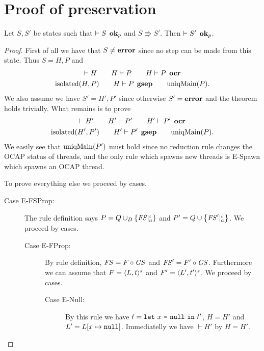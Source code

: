 \section{Proof of preservation}
\label{sec:proof_of_preservation}

\begin{theorem*}[Preservation]
  Let $S, S'$ be states such that $\vdash S \:\: \mbox{{\bf ok}$_p$}$ and $S \Rrightarrow
  S'$. Then $\vdash S' \:\: \mbox{{\bf ok}$_p$}$.
\end{theorem*}

\begin{proof} 
  First of all we have that $S \neq \mbox{{\bf error}}$ since no step can be made from this
  state. Thus $S = H, P$ and
  \begin{equation*}
    \begin{gathered}
      \vdash H \quad\quad H \vdash P \quad\quad H \vdash P \:\: \mbox{\bf ocr} \\
      \mbox{$\mathrm{isolated}$}{(H, P)} \quad\quad H \vdash P \:\: \mbox{\bf gsep} \quad\quad \mbox{$\mathrm{uniqMain}$}(P).
    \end{gathered}
  \end{equation*}
  We also assume we have $S' = H', P'$ since otherwise $S' = \mbox{{\bf error}}$ and the
  theorem holds trivially. What remains is to prove
  \begin{equation*}
    \begin{gathered}
      \vdash H' \quad\quad H' \vdash P' \quad\quad H' \vdash P' \:\: \mbox{\bf ocr} \\
      \mbox{$\mathrm{isolated}$}{(H', P')} \quad\quad H' \vdash P' \:\: \mbox{\bf gsep} \quad\quad
      \mbox{$\mathrm{uniqMain}$}(P).
    \end{gathered}
  \end{equation*}
  We easily see that $\mbox{$\mathrm{uniqMain}$}(P')$ must hold since no reduction rule changes
  the OCAP status of threads, and the only rule which spawns new threads is {\sc
  E-Spawn} which spawns an OCAP thread.

  To prove everything else we proceed by cases.
  \begin{description}
    \item[Case {\sc E-FSProp}:] The \EFSProp{} rule definition says $P =
      Q \cup_D \left\{ \mathit{FS}|_a^\iota \right\}$ and $P' = Q \cup \left\{
        \mathit{FS}'|_a^\iota \right\}$. We proceed by cases.
      \begin{description}
        \item[Case {\sc E-FProp}:] By \EFProp{} rule definition, $\mathit{FS} = F \circ
          \mathit{GS}$ and $\mathit{FS}' = F' \circ \mathit{GS}$. Furthermore we can assume
          that $F = \mbox{$\langle L, t \rangle^s$}$ and $F' = \mbox{$\langle L', t' \rangle^s$}$.
          We proceed by cases.
          \begin{description}
            \item[Case {\sc E-Null}:] By this rule we have $t =
              \mbox{\mdseries\texttt{let}~$x$~\texttt{=}~$\mbox{\mdseries\texttt{null}}$~\texttt{in}~$t'$}$, $H = H'$ and $L' = L[x \mapsto \mbox{\mdseries\texttt{null}}]$.
              Immediatelly we have $\vdash H'$ by $H = H'$.


\end{description}
\end{description}
\end{description}
\end{proof}
